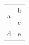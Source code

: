 \documentclass{oup-authoring-template}
\begin{document}
\begin{tabular}{ll}
\multirow{2}{*}{a} & b \\
 & c \\
d & e \\
\end{tabular}
\end{document}
